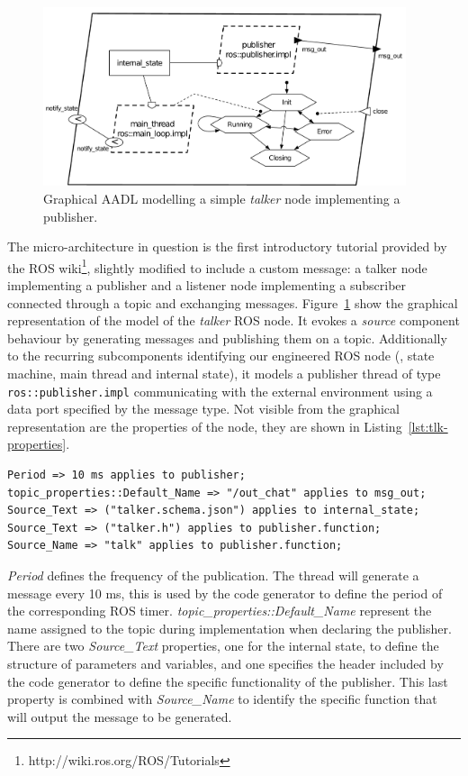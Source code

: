 \begin{figure}[t]
\centering
\includegraphics[width=0.95\textwidth]{gfx/usecase-publisher}
\caption{Graphical AADL modelling a simple \textit{talker} node implementing a publisher.}\label{fig:usecase-publisher}
\end{figure}

The micro-architecture in question is the first introductory tutorial provided by the ROS wiki\footnote{http://wiki.ros.org/ROS/Tutorials}, slightly modified to include a custom message: a talker node implementing a publisher and a listener node implementing a subscriber connected through a topic and exchanging messages. Figure~\ref{fig:usecase-publisher} show the graphical representation of the model of the \textit{talker} ROS node. It evokes a \textit{source} component behaviour by generating messages and publishing them on a topic. Additionally to the recurring subcomponents identifying our engineered ROS node (\ie, state machine, main thread and internal state), it models a publisher thread of type \texttt{ros::publisher.impl} communicating with the external environment using a data port specified by the message type. Not visible from the graphical representation are the properties of the node, they are shown in Listing~\ref{lst:tlk-properties}.

\begin{lstlisting}[language=AADL,caption={Properties of the talker node.},label=lst:tlk-properties]
Period => 10 ms applies to publisher;
topic_properties::Default_Name => "/out_chat" applies to msg_out;
Source_Text => ("talker.schema.json") applies to internal_state;
Source_Text => ("talker.h") applies to publisher.function;
Source_Name => "talk" applies to publisher.function;
\end{lstlisting}

\textit{Period} defines the frequency of the publication. The thread will generate a message every 10 ms, this is used by the code generator to define the period of the corresponding ROS timer. \textit{topic\_properties::Default\_Name} represent the name assigned to the topic during implementation when declaring the publisher. There are two \textit{Source\_Text} properties, one for the internal state, to define the structure of parameters and variables, and one specifies the header included by the code generator to define the specific functionality of the publisher. This last property is combined with \textit{Source\_Name} to identify the specific function that will output the message to be generated.

